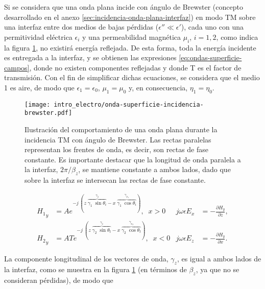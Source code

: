 Si se considera que una onda plana incide con ángulo de Brewster (concepto desarrollado en el anexo \ref{sec:incidencia-onda-plana-interfaz}) en modo TM sobre una interfaz entre dos medios de bajas pérdidas ($\epsilon'' \ll \epsilon'$), cada uno con una permitividad eléctrica $\epsilon_i$ y una permeabilidad magnética $\mu_i$, $i=1,2$, como indica la figura \ref{fig:onda-superficie-brewster}, no existirá energía reflejada. De esta forma, toda la energía incidente es entregada a la interfaz, y se obtienen las expresiones \ref{eq:ondas-superficie-campos}, donde no existen componentes reflejadas y donde T es el factor de transmisión. Con el fin de simplificar dichas ecuaciones, se considera que el medio 1 es aire, de modo que $\epsilon_1 = \epsilon_0$, $\mu_1 = \mu_0$ y, en consecuencia, $\eta_1 = \eta_0$.

\begin{figure}[htp]
	\centering
	\texttt{[image: intro\_electro/onda-superficie-incidencia-brewster.pdf]}
	\caption{Ilustración del comportamiento de una onda plana durante la incidencia TM con ángulo de Brewster. Las rectas paralelas representan los frentes de onda, es decir, son rectas de fase constante. Es importante destacar que la longitud de onda paralela a la interfaz, $2\pi/\beta_z$, se mantiene constante a ambos lados, dado que sobre la interfaz se intersecan las rectas de fase constante.}
	\label{fig:onda-superficie-brewster}
\end{figure}

\begin{subequations}
	\label{eq:ondas-superficie-campos}
	\begin{align}
	{H_1}_y &= A e^{-j\ (z\; \overbrace{\gamma_1\;\sin \theta_i}^{\gamma_z} - x\; \overbrace{\gamma_1\;\cos \theta_i}^{\gamma_{x_1}})},\;\; x>0 & j\omega\epsilon E_x &= -\frac{\partial H_y}{\partial z}, \\
	{H_2}_y &= A T e^{-j\; (z\; \overbrace{\gamma_2\; \sin \theta_t}^{\gamma_z} - x\; \overbrace{\gamma_2\; \cos \theta_t}^{\gamma_{x_2}})},\;\; x<0   & j\omega\epsilon E_z &= -\frac{\partial H_y}{\partial x} .
	\end{align}
\end{subequations}

La componente longitudinal de los vectores de onda, $\gamma_z$, es igual a ambos lados de la interfaz, como se muestra en la figura \ref{fig:onda-superficie-brewster} (en términos de $\beta_z$, ya que no se consideran pérdidas), de modo que

